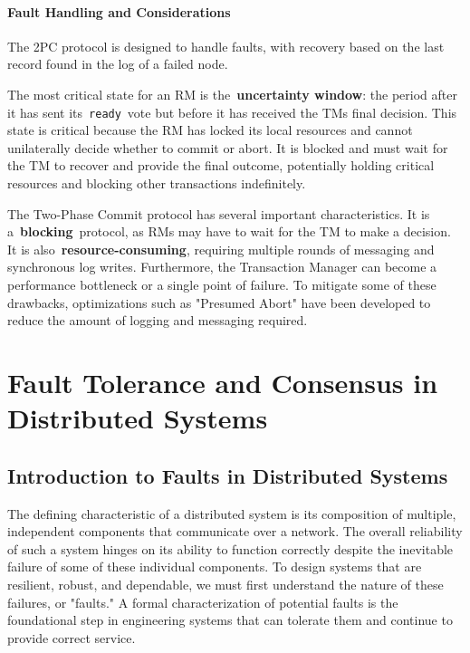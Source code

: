 \documentclass{scrbook}
\begin{document}
\subsubsection{Fault Handling and Considerations}

The 2PC protocol is designed to handle faults, with recovery based on
the last record found in the log of a failed node.

The most critical state for an RM is the~\textbf{uncertainty window}:
the period after it has sent its~\texttt{ready}~vote but before it has
received the TM\textquotesingle s final decision. This state is critical
because the RM has locked its local resources and cannot unilaterally
decide whether to commit or abort. It is blocked and must wait for the
TM to recover and provide the final outcome, potentially holding
critical resources and blocking other transactions indefinitely.

The Two-Phase Commit protocol has several important characteristics. It
is a~\textbf{blocking}~protocol, as RMs may have to wait for the TM to
make a decision. It is also~\textbf{resource-consuming}, requiring
multiple rounds of messaging and synchronous log writes. Furthermore,
the Transaction Manager can become a performance bottleneck or a single
point of failure. To mitigate some of these drawbacks, optimizations
such as "Presumed Abort" have been developed to reduce the amount of
logging and messaging required.

\chapter{Fault Tolerance and Consensus in Distributed Systems}

\section{Introduction to Faults in Distributed Systems}

The defining characteristic of a distributed system is its composition
of multiple, independent components that communicate over a network. The
overall reliability of such a system hinges on its ability to function
correctly despite the inevitable failure of some of these individual
components. To design systems that are resilient, robust, and
dependable, we must first understand the nature of these failures, or
"faults." A formal characterization of potential faults is the
foundational step in engineering systems that can tolerate them and
continue to provide correct service.
\end{document}
